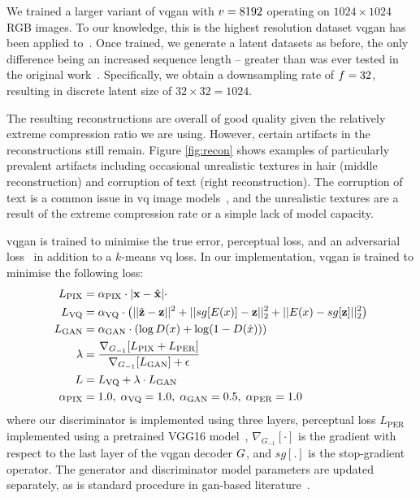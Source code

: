 We trained a larger variant of \gls{vqgan} with $v = 8192$ operating on
$1024 \times 1024$ RGB images. To our knowledge, this is the highest resolution
dataset \gls{vqgan} has been applied to~\cite{esser2021taming}. Once trained,
we generate a latent datasets as before, the only difference being an increased
sequence length -- greater than was ever tested in the original
work~\cite{savinov2022stepunrolled}. Specifically, we obtain a downsampling rate
of $f=32$, resulting in discrete latent size of $32 \times 32 =
1024$.

The resulting reconstructions are overall of good quality given the relatively
extreme compression ratio we are using. However, certain artifacts in the
reconstructions still remain. Figure \ref{fig:recon} shows examples of
particularly prevalent artifacts including occasional unrealistic textures in
hair (middle reconstruction) and corruption of text (right reconstruction). The
corruption of text is a common issue in \gls{vq} image
models~\cite{ramesh2021dalle}, and the unrealistic textures are a result of the
extreme compression rate or a simple lack of model capacity.

\Gls{vqgan} is trained to minimise the true error, perceptual loss, and an
adversarial loss~\cite{esser2021taming} in addition to a $k$-means \gls{vq}
loss. In our implementation, \gls{vqgan} is trained to minimise the following
loss:
\begin{align}
\begin{split}
    L_\text{PIX} &= \alpha_\text{PIX} \cdot |\mathbf{x} - \hat{\mathbf{x}}| \cdot \\
    L_\text{VQ} &= \alpha_\text{VQ} \cdot \left(||\hat{\mathbf{z}} -
    \mathbf{z}||^2 + ||sg[E(x)] - \mathbf{z}||^2_2 + ||E(x) -
    sg[\mathbf{z}]||^2_2\right)\\
    L_\text{GAN} &= \alpha_\text{GAN} \cdot \left(\log D(x) + \log
    (1-D(\hat{x}))\right) \\
    \lambda &= \frac{\nabla_{G_{-1}}[L_\text{PIX} +
    L_\text{PER}]}{\nabla_{G_{-1}}[L_\text{GAN}] + \epsilon}\\
    L &= L_\text{VQ} + \lambda \cdot L_\text{GAN}\\
    \alpha_\text{PIX} &= 1.0,\; \alpha_\text{VQ} = 1.0,\; \alpha_\text{GAN} = 0.5,\; \alpha_\text{PER} = 1.0
\end{split}
\end{align}
\cite{esser2021taming} where our discriminator is implemented using three
layers, perceptual loss $L_\text{PER}$ implemented using a pretrained VGG16
model~\cite{karen2014vg18}, $\nabla_{G_{-1}}[\cdot]$ is the gradient with
respect to the last layer of the \gls{vqgan} decoder $G$, and
$sg[.]$ is the stop-gradient operator. The
generator and discriminator model parameters are updated separately, as is
standard procedure in \gls{gan}-based literature~\cite{esser2021taming}.

